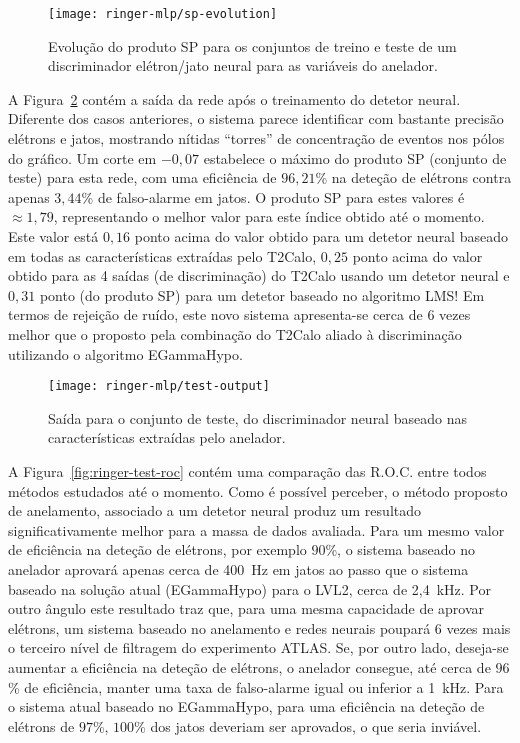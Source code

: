 \begin{figure}
\begin{center}
\texttt{[image: ringer-mlp/sp-evolution]}
\end{center}
\caption{Evolução do produto SP para os conjuntos de treino e teste de um
discriminador elétron/jato neural para as variáveis do anelador.}
\label{fig:ringer-mlp-sp}
\end{figure}

A Figura~\ref{fig:ringer-mlp-output} contém a saída da rede após o treinamento
do detetor neural. Diferente dos casos anteriores, o sistema parece
identificar com bastante precisão elétrons e jatos, mostrando nítidas
``torres'' de concentração de eventos nos pólos do gráfico. Um corte em
$-0,07$ estabelece o máximo do produto SP (conjunto de teste) para esta rede,
com uma eficiência de $96,21$\% na deteção de elétrons contra apenas $3,44$\%
de falso-alarme em jatos. O produto SP para estes valores é $\approx 1,79$,
representando o melhor valor para este índice obtido até o momento. Este valor
está $0,16$ ponto acima do valor obtido para um detetor neural baseado em
todas as características extraídas pelo T2Calo, $0,25$ ponto acima do valor
obtido para as 4 saídas (de discriminação) do T2Calo usando um detetor neural
e $0,31$ ponto (do produto SP) para um detetor baseado no algoritmo LMS! Em
termos de rejeição de ruído, este novo sistema apresenta-se cerca de 6 vezes
melhor que o proposto pela combinação do T2Calo aliado à discriminação
utilizando o algoritmo EGammaHypo.

\begin{figure}
\begin{center}
\texttt{[image: ringer-mlp/test-output]}
\end{center}
\caption{Saída para o conjunto de teste, do discriminador neural baseado nas
características extraídas pelo anelador.}
\label{fig:ringer-mlp-output}
\end{figure}

A Figura~\ref{fig:ringer-test-roc} contém uma comparação das R.O.C. entre
todos métodos estudados até o momento. Como é possível perceber, o método
proposto de anelamento, associado a um detetor neural produz um resultado
significativamente melhor para a massa de dados avaliada. Para um mesmo valor
de eficiência na deteção de elétrons, por exemplo $90$\%, o sistema baseado no
anelador aprovará apenas cerca de 400~Hz em jatos ao passo que o sistema
baseado na solução atual (EGammaHypo) para o LVL2, cerca de 2,4~kHz. Por outro
ângulo este resultado traz que, para uma mesma capacidade de aprovar elétrons,
um sistema baseado no anelamento e redes neurais poupará 6 vezes mais o
terceiro nível de filtragem do experimento ATLAS. Se, por outro lado, deseja-se
aumentar a eficiência na deteção de elétrons, o anelador consegue, até cerca
de $96$\% de eficiência, manter uma taxa de falso-alarme igual ou inferior a
1~kHz. Para o sistema atual baseado no EGammaHypo, para uma eficiência na
deteção de elétrons de $97$\%, $100$\% dos jatos deveriam ser aprovados, o que
seria inviável.

